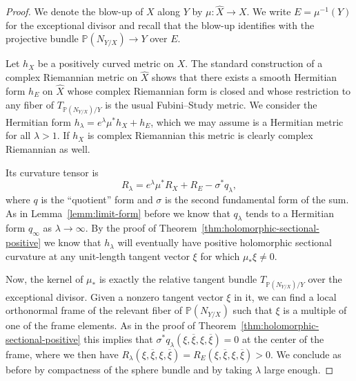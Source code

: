 \documentclass[10pt,a4paper]{amsart}
\theoremstyle{definition}
\newcommand{\kk}[1]{\mathbb{#1}}
\def\ov#1{\overline{#1}}
\def\kahler{complex Riemannian}
\begin{document}
\begin{proof}
We denote the blow-up of $X$ along $Y$ by $\mu : \hat X \to X$.
We write $E = \mu^{-1}(Y)$ for the exceptional divisor and recall that the blow-up identifies with the projective bundle $\kk P(N_{Y/X}) \to Y$ over $E$.

Let $h_{X}$ be a positively curved metric on $X$.
The standard construction of a \kahler{} metric on $\hat X$ \cite[Proposition~3.24]{voisin2002theorie} shows that there exists a smooth Hermitian form $h_{E}$ on $\hat X$ whose \kahler{} form is closed and whose restriction to any fiber of $T_{\kk P(N_{Y/X})/Y}$ is the usual Fubini--Study metric.
We consider the Hermitian form $h_{\lambda} = e^{\lambda} \mu^{*} h_{X} + h_{E}$, which we may assume is a Hermitian metric for all $\lambda > 1$.
If $h_{X}$ is \kahler{} this metric is clearly \kahler{} as well.

Its curvature tensor is
\[
  R_{\lambda} = e^{\lambda} \mu^{*} R_{X} + R_{E} - \sigma^{*} q_{\lambda},
\]
where $q$ is the ``quotient'' form and $\sigma$ is the second fundamental form of the sum.
As in Lemma~\ref{lemm:limit-form} before we know that $q_{\lambda}$ tends to a Hermitian form $q_{\infty}$ as $\lambda \to \infty$.
By  the proof of Theorem~\ref{thm:holomorphic-sectional-positive} we know that $h_{\lambda}$ will eventually have positive holomorphic sectional curvature at any unit-length tangent vector $\xi$ for which $\mu_{*}\xi \not= 0$.

Now, the kernel of $\mu_{*}$ is exactly the relative tangent bundle $T_{\kk P(N_{Y/X})/Y}$ over the exceptional divisor.
Given a nonzero tangent vector $\xi$ in it, we can find a local orthonormal frame of the relevant fiber of $\kk P(N_{Y/X})$ such that $\xi$ is a multiple of one of the frame elements.
As in the proof of Theorem~\ref{thm:holomorphic-sectional-positive} this implies that $\sigma^{*}q_{\lambda}(\xi, \ov\xi, \xi, \ov\xi) = 0$ at the center of the frame, where we then have
$R_{\lambda}(\xi,\ov\xi,\xi,\ov\xi) = R_{E}(\xi,\ov\xi,\xi,\ov\xi) > 0$.
We conclude as before by compactness of the sphere bundle and by taking $\lambda$ large enough.
\end{proof}










\end{document}

